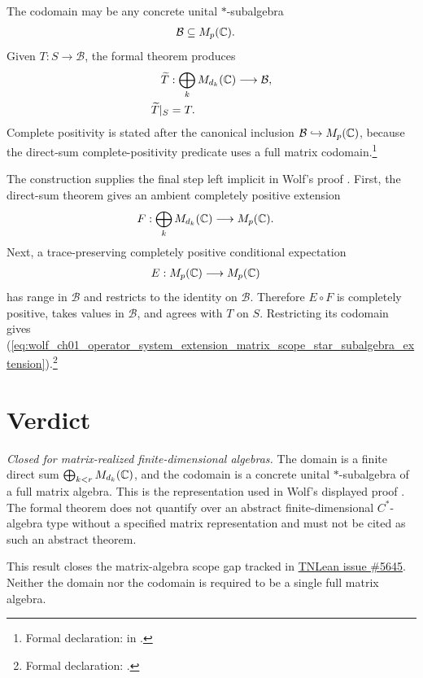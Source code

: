 \documentclass{article}
\begin{document}
The codomain may be any concrete unital $*$-subalgebra
\begin{align}
    \mathcal B
        &\subseteq M_{p}(\mathbb{C}).
    \label{eq:wolf_ch01_operator_system_extension_matrix_scope_concrete_codomain}
\end{align}
Given $T:S\to\mathcal B$, the formal theorem produces
\begin{align}
    \widetilde T
        &:\bigoplus_kM_{d_k}(\mathbb{C})\longrightarrow\mathcal B,
    \label{eq:wolf_ch01_operator_system_extension_matrix_scope_star_subalgebra_extension}\\
    \widetilde T|_S
        &=T.
    \label{eq:wolf_ch01_operator_system_extension_matrix_scope_star_subalgebra_agreement}
\end{align}
Complete positivity is stated after the canonical inclusion
$\mathcal B\hookrightarrow M_{p}(\mathbb{C})$, because the direct-sum complete-positivity
predicate uses a full matrix codomain.\footnote{Formal declaration:
in .}

The construction supplies the final step left implicit in Wolf's proof
\cite[lines~620--626]{Wolf2012Quantum}. First, the direct-sum theorem gives an
ambient completely positive extension
\begin{align}
    F
        &:\bigoplus_kM_{d_k}(\mathbb{C})\longrightarrow M_{p}(\mathbb{C}).
    \label{eq:wolf_ch01_operator_system_extension_matrix_scope_ambient_extension}
\end{align}
Next, a trace-preserving completely positive conditional expectation
\begin{align}
    E
        &:M_{p}(\mathbb{C})\longrightarrow M_{p}(\mathbb{C})
    \label{eq:wolf_ch01_operator_system_extension_matrix_scope_conditional_expectation}
\end{align}
has range in $\mathcal B$ and restricts to the identity on $\mathcal B$.
Therefore $E\circ F$ is completely positive, takes values in $\mathcal B$, and
agrees with $T$ on $S$. Restricting its codomain gives
(\ref{eq:wolf_ch01_operator_system_extension_matrix_scope_star_subalgebra_extension}).\footnote{Formal
declaration:
.}

\section{Verdict}

\emph{Closed for matrix-realized finite-dimensional algebras.} The domain is a
finite direct sum $\bigoplus_{k<r}M_{d_k}(\mathbb{C})$, and the codomain is a concrete
unital $*$-subalgebra of a full matrix algebra. This is the representation used
in Wolf's displayed proof \cite[lines~620--626]{Wolf2012Quantum}. The formal
theorem does not quantify over an abstract finite-dimensional $C^\ast$-algebra
type without a specified matrix representation and must not be cited as such
an abstract theorem.

This result closes the matrix-algebra scope gap tracked in
\href{https://github.com/LionSR/TNLean/issues/5645}{TNLean issue \#5645}.
Neither the domain nor the codomain is required to be a single full matrix
algebra.



\end{document}
